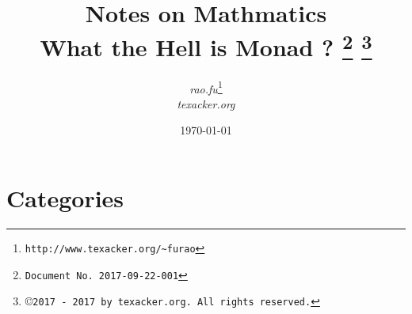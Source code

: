 \documentclass{article}
\begin{document}


\title{\textbf{Notes on Mathmatics} \\[1em] What the Hell is Monad ?
{\footnote{\texttt{Document No. 2017-09-22-001}}}
{\footnote{\copyright \texttt{2017 - 2017 by texacker.org. All rights reserved.}}}
}

\author{%
\small{\textit{rao.fu}}\thanks{\texttt{http://www.texacker.org/\~{}furao}} \\ \small{\textit{texacker.org}}
}
\date{\today}

\maketitle

\section{Categories}
\end{document}
